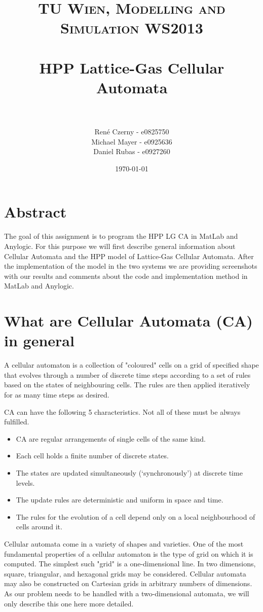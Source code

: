 \documentclass[paper=a4, fontsize=11pt]{scrartcl} %
\title{	
\normalfont \normalsize 
\textsc{TU Wien, Modelling and Simulation WS2013} \\ [25pt] %
\horrule{0.5pt} \\[0.4cm] %
\huge HPP Lattice-Gas Cellular Automata \\ %
\horrule{2pt} \\[0.5cm] %
}
\author{René Czerny - e0825750\\Michael Mayer - e0925636\\Daniel Rubas - e0927260}
\date{\normalsize\today} %
\numberwithin{equation}{section} %
\numberwithin{figure}{section} %
\numberwithin{table}{section} %
\begin{document}
\maketitle %

\section{Abstract}

The goal of this assignment is to program the HPP LG CA in MatLab and Anylogic. For this purpose we will first describe general information about Cellular Automata and the HPP model of Lattice-Gas Cellular Automata. After the implementation of the model in the two systems we are providing screenshots with our results and comments about the code and implementation method in MatLab and Anylogic.

\section{What are Cellular Automata (CA) in general}

A cellular automaton is a collection of "coloured" cells on a grid of specified shape that evolves through a number of discrete time steps according to a set of rules based on the states of neighbouring cells. The rules are then applied iteratively for as many time steps as desired. \cite{mathworld}

CA  can have the following 5 characteristics. Not all of these must be always fulfilled. 

\begin{itemize}
	\item CA are regular arrangements of single cells of the same kind.
	\item Each cell holds a finite number of discrete states.
	\item The states are updated simultaneously (`synchronously') at discrete time levels.
	\item The update rules are deterministic and uniform in space and time.
	\item The rules for the evolution of a cell depend only on a local neighbourhood of cells around it. 
	\cite{LGCA}
\end{itemize}

Cellular automata come in a variety of shapes and varieties. One of the most fundamental properties of a cellular automaton is the type of grid on which it is computed. The simplest such "grid" is a one-dimensional line. In two dimensions, square, triangular, and hexagonal grids may be considered. Cellular automata may also be constructed on Cartesian grids in arbitrary numbers of dimensions. 
As our problem needs to be handled with a two-dimensional automata, we will only describe this one here more detailed.  \cite{mathworld}
\end{document}
